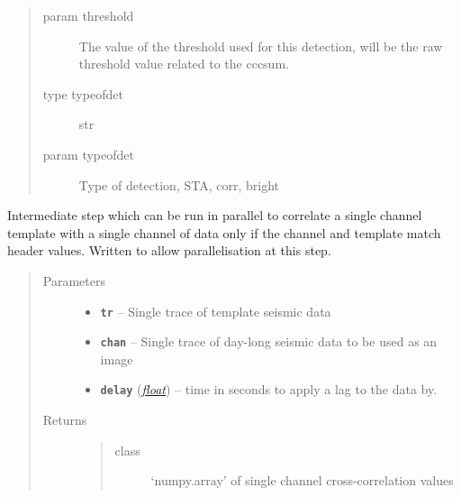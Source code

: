 \documentclass[a4paper,10pt,english]{sphinxmanual}
\begin{document}
\begin{fulllineitems}
\begin{description}
\begin{quote}
\begin{description}
\item[{param threshold}] \leavevmode
The value of the threshold used for this detection,        will be the raw threshold value related to the cccsum.

\item[{type typeofdet}] \leavevmode
str

\item[{param typeofdet}] \leavevmode
Type of detection, STA, corr, bright

\end{description}\end{quote}

\end{description}

\end{fulllineitems}


\begin{fulllineitems}
\label{modules:match_filter._channel_loop}
Intermediate step which can be run in parallel to correlate a single
channel template with a single channel of data only if the channel and
template match header values.  Written to allow parallelisation at this
step.
\begin{quote}\begin{description}
\item[{Parameters}] \leavevmode\begin{itemize}
\item {} 
\textbf{\texttt{tr}} -- Single trace of template seismic data

\item {} 
\textbf{\texttt{chan}} -- Single trace of day-long seismic data to be used as an image

\item {} 
\textbf{\texttt{delay}} (\href{https://docs.python.org/library/functions.html\#float}{\emph{float}}) -- time in seconds to apply a lag to the data by.

\end{itemize}

\item[{Returns}] \leavevmode
\begin{quote}\begin{description}
\item[{class}] \leavevmode
`numpy.array' of single channel cross-correlation values

\end{description}\end{quote}


\end{description}\end{quote}

\end{fulllineitems}
\end{document}
